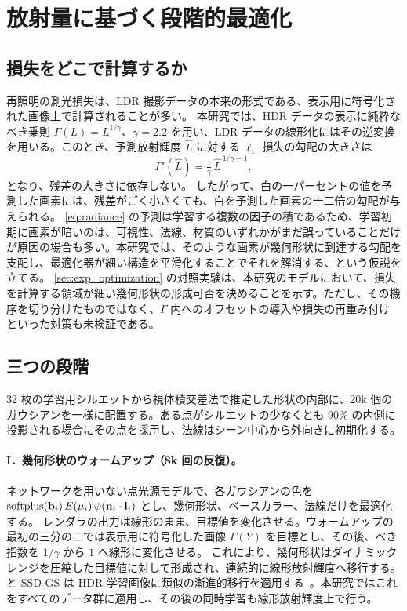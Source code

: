 \section{放射量に基づく段階的最適化}
\label{sec:optimization}

\subsection{損失をどこで計算するか}
\label{sec:lossdomain}
再照明の測光損失は、LDR 撮影データの本来の形式である、表示用に符号化された画像上で計算されることが多い。
本研究では、HDR データの表示に純粋なべき乗則 $\Gamma(L)=L^{1/\gamma}$、$\gamma=2.2$ を用い、LDR データの線形化にはその逆変換を用いる。このとき、予測放射輝度 $\hat L$ に対する $\ell_1$ 損失の勾配の大きさは
\begin{equation}
  \Gamma'(\hat L)=\tfrac{1}{\gamma}\,\hat L^{\,1/\gamma-1},
  \label{eq:slope}
\end{equation}
となり、残差の大きさに依存しない。
したがって、白の一パーセントの値を予測した画素には、残差がごく小さくても、白を予測した画素の十二倍の勾配が与えられる。
\cref{eq:radiance} の予測は学習する複数の因子の積であるため、学習初期に画素が暗いのは、可視性、法線、材質のいずれかがまだ誤っていることだけが原因の場合も多い。本研究では、そのような画素が幾何形状に到達する勾配を支配し、最適化器が細い構造を平滑化することでそれを解消する、という仮説を立てる。
\cref{sec:exp_optimization} の対照実験は、本研究のモデルにおいて、損失を計算する領域が細い幾何形状の形成可否を決めることを示す。ただし、その機序を切り分けたものではなく、$\Gamma$ 内へのオフセットの導入や損失の再重み付け~\cite{mildenhall2022nerf} といった対策も未検証である。

\subsection{三つの段階}
\label{sec:stages}
32 枚の学習用シルエットから視体積交差法で推定した形状の内部に、20k 個のガウシアンを一様に配置する。ある点がシルエットの少なくとも 90\% の内側に投影される場合にその点を採用し、法線はシーン中心から外向きに初期化する。

\paragraph{I．幾何形状のウォームアップ（8k 回の反復）。}
ネットワークを用いない点光源モデルで、各ガウシアンの色を $\operatorname{softplus}(\mathbf{b}_i)\,\bar E(\mu_i)\,\psi(\mathbf{n}_i\cdot\mathbf{l}_i)$ とし、幾何形状、ベースカラー、法線だけを最適化する。
レンダラの出力は線形のまま、目標値を変化させる。ウォームアップの最初の三分の二では表示用に符号化した画像 $\Gamma(Y)$ を目標とし、その後、べき指数を $1/\gamma$ から $1$ へ線形に変化させる。
これにより、幾何形状はダイナミックレンジを圧縮した目標値に対して形成され、連続的に線形放射輝度へ移行する。
\gsthree と SSD-GS は HDR 学習画像に類似の漸進的移行を適用する~\cite{bi2024gs3,zheng2026ssdgs}。本研究ではこれをすべてのデータ群に適用し、その後の同時学習も線形放射輝度上で行う。

